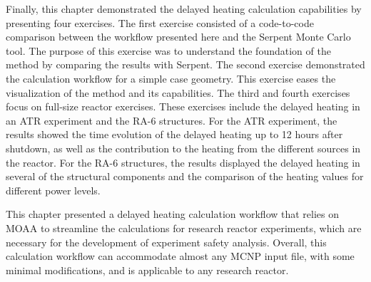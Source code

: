 Finally, this chapter demonstrated the delayed heating calculation capabilities by presenting four exercises.
The first exercise consisted of a code-to-code comparison between the workflow presented here and the Serpent Monte Carlo tool.
The purpose of this exercise was to understand the foundation of the method by comparing the results with Serpent.
The second exercise demonstrated the calculation workflow for a simple case geometry.
This exercise eases the visualization of the method and its capabilities.
The third and fourth exercises focus on full-size reactor exercises.
These exercises include the delayed heating in an ATR experiment and the RA-6 structures.
For the ATR experiment, the results showed the time evolution of the delayed heating up to 12 hours after shutdown, as well as the contribution to the heating from the different sources in the reactor.
For the RA-6 structures, the results displayed the delayed heating in several of the structural components and the comparison of the heating values for different power levels.

This chapter presented a delayed heating calculation workflow that relies on MOAA to streamline the calculations for research reactor experiments, which are necessary for the development of experiment safety analysis.
Overall, this calculation workflow can accommodate almost any MCNP input file, with some minimal modifications, and is applicable to any research reactor.
